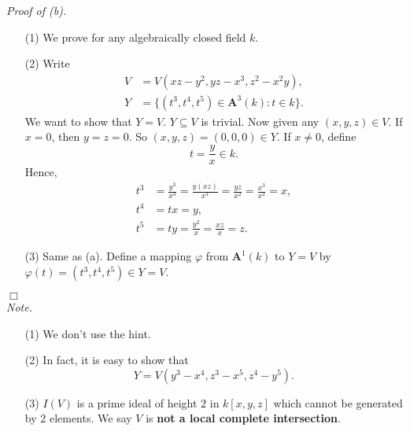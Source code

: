 \documentclass{article}
\begin{document}
\emph{Proof of (b).}
\begin{enumerate}
\item[(1)]
  We prove for any algebraically closed field $k$.

\item[(2)]
  Write
  \begin{align*}
    V &= V(xz-y^2, yz - x^3, z^2-x^2y), \\
    Y &= \{ (t^3,t^4,t^5) \in \mathbf{A}^3(k) : t \in k \}.
  \end{align*}
  We want to show that $Y = V$. $Y \subseteq V$ is trivial.
  Now given any $(x,y,z) \in V$.
  If $x = 0$, then $y = z = 0$. So $(x,y,z) = (0,0,0) \in Y$.
  If $x \neq 0$, define
  \[
    t = \frac{y}{x} \in k.
  \]
  Hence,
  \begin{align*}
    t^3 &= \frac{y^3}{x^3} = \frac{y(xz)}{x^3} = \frac{yz}{x^2} = \frac{x^3}{x^2} = x, \\
    t^4 &= tx = y, \\
    t^5 &= ty = \frac{y^2}{x} = \frac{xz}{x} = z.
  \end{align*}

\item[(3)]
  Same as (a).
  Define a mapping $\varphi$ from $\mathbf{A}^1(k)$ to $Y = V$
  by $\varphi(t) = (t^3,t^4,t^5) \in Y = V$.
\end{enumerate}
$\Box$ \\



\emph{Note.}
\begin{enumerate}
\item[(1)]
  We don't use the hint.

\item[(2)]
  In fact, it is easy to show that
  \[
    Y = V(y^3-x^4, z^3-x^5, z^4-y^5).
  \]

\item[(3)]
  $I(V)$ is a prime ideal of height $2$ in $k[x,y,z]$
  which cannot be generated by $2$ elements.
  We say $V$ is \textbf{not a local complete intersection}. \\\\
\end{enumerate}



\end{document}
